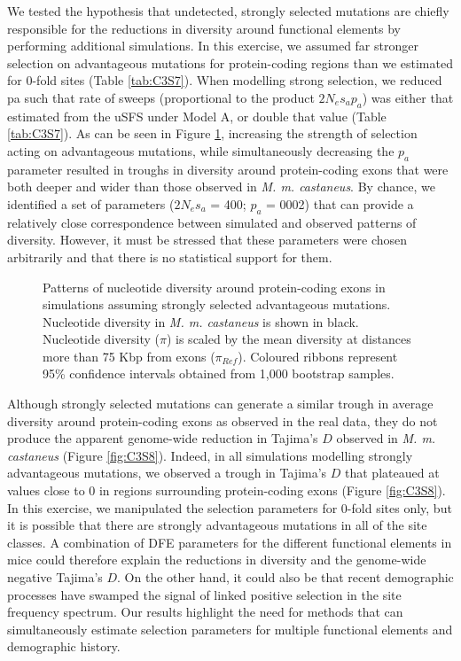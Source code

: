 	We tested the hypothesis that undetected, strongly selected mutations are chiefly responsible for the reductions in diversity around functional elements by performing additional simulations. In this exercise, we assumed far stronger selection on advantageous mutations for protein-coding regions than we estimated for 0-fold sites (Table \ref{tab:C3S7}). When modelling strong selection, we reduced pa such that rate of sweeps (proportional to the product $2N_es_ap_a$) was either that estimated from the uSFS under Model A, or double that value (Table \ref{tab:C3S7}). As can be seen in Figure \ref{fig:strongSelection}, increasing the strength of selection acting on advantageous mutations, while simultaneously decreasing the $p_a$ parameter resulted in troughs in diversity around protein-coding exons that were both deeper and wider than those observed in \textit{M. m. castaneus}. By chance, we identified a set of parameters ($2N_es_a$ = 400; $p_a$ = 0002) that can provide a relatively close correspondence between simulated and observed patterns of diversity. However, it must be stressed that these parameters were chosen arbitrarily and that there is no statistical support for them.

\begin{figure}[H]
   \centering      
   \noindent{}
 \caption[Reductions in diversity around exons caused by strong positive selection]{Patterns of nucleotide diversity around protein-coding exons in simulations assuming strongly selected advantageous mutations. Nucleotide diversity in \textit{M. m. castaneus} is shown in black. Nucleotide diversity ($\pi$) is scaled by the mean diversity at distances more than 75 Kbp from exons ($\pi_{Ref}$). Coloured ribbons represent 95\% confidence intervals obtained from 1,000 bootstrap samples.}
 \label{fig:strongSelection}
\end{figure}

	Although strongly selected mutations can generate a similar trough in average diversity around protein-coding exons as observed in the real data, they do not produce the apparent genome-wide reduction in Tajima's $D$ observed in \textit{M. m. castaneus} (Figure \ref{fig:C3S8}). Indeed, in all simulations modelling strongly advantageous mutations, we observed a trough in Tajima's $D$ that plateaued at values close to 0 in regions surrounding protein-coding exons (Figure \ref{fig:C3S8}). In this exercise, we manipulated the selection parameters for 0-fold sites only, but it is possible that there are strongly advantageous mutations in all of the site classes. A combination of DFE parameters for the different functional elements in mice could therefore explain the reductions in diversity and the genome-wide negative Tajima's $D$. On the other hand, it could also be that recent demographic processes have swamped the signal of linked positive selection in the site frequency spectrum.  Our results highlight the need for methods that can simultaneously estimate selection parameters for multiple functional elements and demographic history. 

